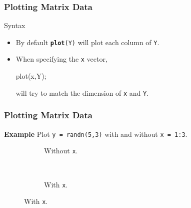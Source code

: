 \documentclass[compress]{beamer}  %
\newcommand{\tttbf}[1]{\texttt{\textbf{#1}}} %
\begin{document}
\begin{frame}[fragile]
\frametitle{Plotting Matrix Data}

\begin{block}{Syntax}
\begin{itemize}[<+->]
    \item By default \tttbf{plot}\texttt{(Y)} will plot each column of \texttt{Y}.
    \item When specifying the \texttt{x} vector,
          \begin{matlabcodebeamer}[frame=none]
          plot(x,Y);
          \end{matlabcodebeamer}
          will try to match the dimension of \texttt{x} and \texttt{Y}.
\end{itemize}
\end{block}

\end{frame}
\begin{frame}[fragile]
\frametitle{Plotting Matrix Data}
\textbf{Example} 
Plot \texttt{y = randn(5,3)} with and without \texttt{x = 1:3}.\pause
\setcounter{subfigure}{0}
\begin{figure}
        \begin{subfigure}[b]{0.3\textwidth}
                \centering
                \caption{Without \texttt{x}.}
        \end{subfigure}%
        ~\pause
        \begin{subfigure}[b]{0.3\textwidth}
                \centering
                \caption{With \texttt{x}.}
        \end{subfigure}
\end{figure}

\end{frame}
\end{document}
